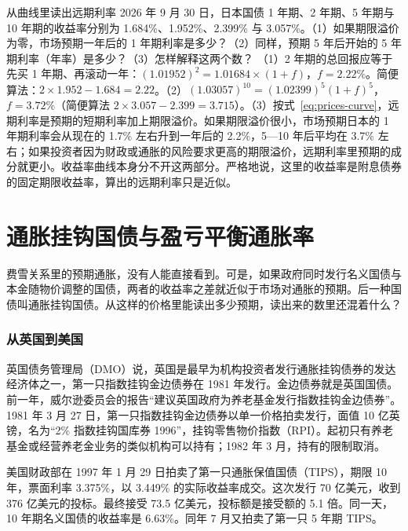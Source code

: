 \begin{example}{从曲线里读出远期利率}\label{ex:prices-forward}
2026 年 9 月 30 日，日本国债 1 年期、2 年期、5 年期与 10 年期的收益率分别为 1.684\%、1.952\%、2.399\% 与 3.057\%。（1）如果期限溢价为零，市场预期一年后的 1 年期利率是多少？（2）同样，预期 5 年后开始的 5 年期利率（年率）是多少？（3）怎样解释这两个数？
\solution （1）2 年期的总回报应等于先买 1 年期、再滚动一年：$(1.01952)^2=1.01684\times(1+f)$，$f=2.22\%$。简便算法：$2\times1.952-1.684=2.22$。（2）$(1.03057)^{10}=(1.02399)^5(1+f)^5$，$f=3.72\%$（简便算法 $2\times3.057-2.399=3.715$）。（3）按式~\eqref{eq:prices-curve}，远期利率是预期的短期利率加上期限溢价。如果期限溢价很小，市场预期日本的 1 年期利率会从现在的 1.7\% 左右升到一年后的 2.2\%，5—10 年后平均在 3.7\% 左右；如果投资者因为财政或通胀的风险要求更高的期限溢价，远期利率里预期的成分就更小。收益率曲线本身分不开这两部分。严格地说，这里的收益率是附息债券的固定期限收益率，算出的远期利率只是近似。
\end{example}

\section{通胀挂钩国债与盈亏平衡通胀率}\label{sec:prices-breakeven}

费雪关系里的预期通胀，没有人能直接看到。可是，如果政府同时发行名义国债与本金随物价调整的国债，两者的收益率之差就近似于市场对通胀的预期。后一种国债叫通胀挂钩国债。从这样的价格里能读出多少预期，读出来的数里还混着什么？

\subsubsection{从英国到美国}
英国债务管理局（DMO）说，英国是最早为机构投资者发行通胀挂钩债券的发达经济体之一，第一只指数挂钩金边债券在 1981 年发行\cite{dmo_il}。金边债券就是英国国债。前一年，威尔逊委员会的报告“建议英国政府为养老基金发行指数挂钩金边债券”。1981 年 3 月 27 日，第一只指数挂钩金边债券以单一价格拍卖发行，面值 10 亿英镑，名为“2\% 指数挂钩国库券 1996”，挂钩零售物价指数（RPI）。起初只有养老基金或经营养老金业务的类似机构可以持有；1982 年 3 月，持有的限制取消\cite{dmo_il}。

美国财政部在 1997 年 1 月 29 日拍卖了第一只通胀保值国债（TIPS），期限 10 年，票面利率 3.375\%，以 3.449\% 的实际收益率成交。这次发行 70 亿美元，收到 376 亿美元的投标。最终接受 73.5 亿美元，投标额是接受额的 5.1 倍\cite{fiscaldata2026}。同一天，10 年期名义国债的收益率是 6.63\%\cite{fred2026}。同年 7 月又拍卖了第一只 5 年期 TIPS\cite{fiscaldata2026}。

